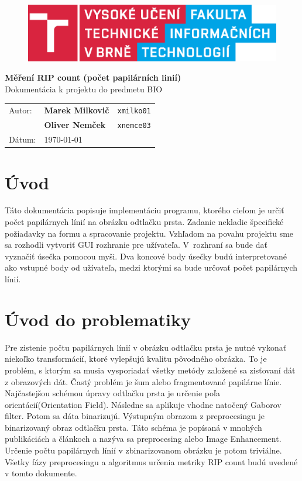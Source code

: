 \documentclass[11pt,a4paper]{article}
\begin{document}
	
\begin{figure}[h]
\includegraphics[scale=0.35]{FIT_barevne_PANTONE_CZ.eps}
\end{figure}


\noindent \textbf{\Large{Měření RIP count}  (počet papilárních linií)} \\ 
Dokumentácia k projektu do predmetu BIO

\vspace{0.5cm}

\noindent\begin{tabular}{@{}lll}
Autor:  &\textbf{Marek Milkovič} & \texttt{xmilko01}\\
  &\textbf{Oliver Nemček} & \texttt{xnemce03} \\
Dátum:  & \today
\end{tabular}

\section*{Úvod}
Táto dokumentácia popisuje implementáciu programu, ktorého cieľom je určiť počet papilárnych línií na obrázku odtlačku prsta. Zadanie nekladie špecifické požiadavky na formu a spracovanie projektu. Vzhľadom na povahu projektu sme sa rozhodli vytvoriť GUI rozhranie pre užívateľa. V~rozhraní sa bude dať vyznačiť úsečka pomocou myši. Dva koncové body úsečky budú interpretované ako vstupné body od užívateľa, medzi ktorými sa bude určovať počet papilárnych línií.

\section*{Úvod do problematiky}
Pre zistenie počtu papilárnych línií v obrázku odtlačku prsta je nutné vykonať niekoľko transformácií, ktoré vylepšujú kvalitu pôvodného obrázka. To je problém, s ktorým sa musia vysporiadať všetky metódy založené sa zisťovaní dát z obrazových dát. Častý problém je šum alebo fragmentované papilárne línie. Najčastejšou schémou úpravy odtlačku prsta je určenie poľa orientácií(Orientation Field). Následne sa aplikuje vhodne natočený Gaborov filter. Potom sa dáta binarizujú. Výstupným obrazom z preprocesingu je binarizovaný obraz odtlačku prsta. Táto schéma je popísaná v mnohých publikáciách a článkoch \cite{hong, thai} a nazýva sa preprocesing alebo Image Enhancement. Určenie počtu papilárnych línií v zbinarizovanom obrázku je potom triviálne. Všetky fázy preprocesingu a algoritmus určenia metriky RIP count budú uvedené v tomto dokumente.
\end{document}
